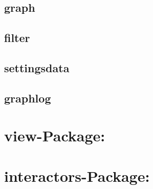     \subsection*{\textbf{graph}}
    
    \subsection*{\textbf{filter}}
    
    \subsection*{\textbf{settingsdata}}
    
    \subsection*{\textbf{graphlog}}


\section{\textbf{view-Package:}}


\section{\textbf{interactors-Package:}}
